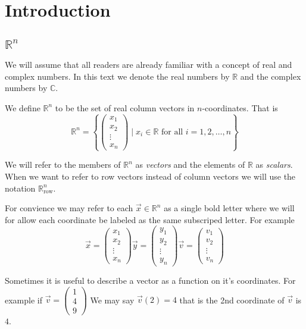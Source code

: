 \section{Introduction}
\subsection{$\mathbb{R}^n$}
We will assume that all readers are already familiar with a concept of real and complex numbers. In this text we denote the real numbers by $\mathbb{R}$ and the complex numbers by $\mathbb{C}$. 

\begin{definition}
We define $\mathbb{R}^n$ to be the set of real column vectors in $n$-coordinates. That is 
\[
\mathbb{R}^n=\left\{ \begin{pmatrix}
x_1\\ x_2 \\ \vdots \\ x_n
\end{pmatrix}
\mid
x_i \in \mathbb{R}\text{ for all }i=1,2, \ldots, n
\right\}
\]

We will refer to the members of $\mathbb{R}^n$ as \emph{vectors} and the elements of $\mathbb{R}$ as \emph{scalars}. When we want to refer to row vectors instead of column vectors we will use the notation $\mathbb{R}^n_\text{row}$.
\end{definition}

For convience we may refer to each $\vec{x} \in \mathbb{R}^n$ as a single bold letter where we will for allow each coordinate be labeled as the same subscriped letter. For example
\[
\vec{x}=\begin{pmatrix}x_1\\ x_2 \\ \vdots \\ x_n\end{pmatrix}
\vec{y}=\begin{pmatrix}y_1\\ y_2 \\ \vdots \\ y_n\end{pmatrix}
\vec{v}=\begin{pmatrix}v_1\\ v_2 \\ \vdots \\ v_n\end{pmatrix}
\]

\begin{remark}
Sometimes it is useful to describe a vector as a function on it's coordinates. For example if 
$\vec{v}=\left(\begin{array}{r}1 \\ 4 \\ 9
\end{array}\right)$ We may say $\vec{v}(2)=4$ that is the 2nd coordinate of $\vec{v}$ is $4$.
\end{remark}



